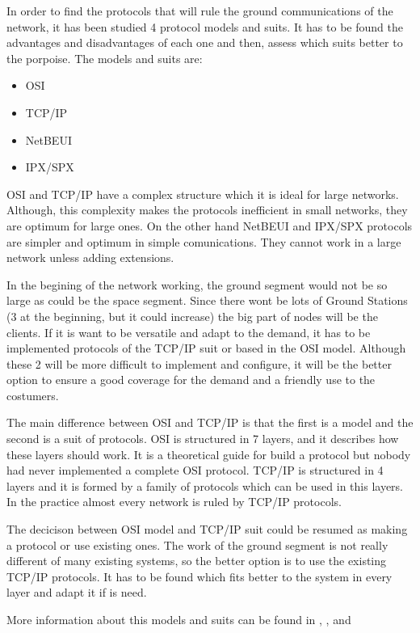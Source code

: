 In order to find the protocols that will rule the ground communications of the network, it has been studied 4 protocol models and suits. It has to be found the advantages and disadvantages of each one and then, assess which suits better to the porpoise. The models and suits are:
\begin{itemize}
\item OSI
\item TCP/IP
\item NetBEUI
\item IPX/SPX
\end{itemize}

OSI and TCP/IP have a complex structure which it is ideal for large networks. Although, this complexity makes the protocols inefficient in small networks, they are optimum for large ones. On the other hand NetBEUI and IPX/SPX protocols are simpler and optimum in simple comunications. They cannot work in a large network unless adding extensions. 

In the begining of the network working, the ground segment would not be so large as could be the space segment. Since there wont be lots of Ground Stations (3 at the beginning, but it could increase) the big part of nodes will be the clients. If it is want to be versatile and adapt to the demand, it has to be implemented protocols of the TCP/IP suit or based in the OSI model. Although these 2 will be more difficult to implement and configure, it will be the better option to ensure a good coverage for the demand and a friendly use to the costumers.

The main difference between OSI and TCP/IP is that the first is a model and the second is a suit of protocols. OSI is structured in 7 layers, and it describes how these layers should work. It is a theoretical guide for build a protocol but nobody had never implemented a complete OSI protocol. TCP/IP is structured in 4 layers and it is formed by a family of protocols which can be used in this layers. In the practice almost every network is ruled by TCP/IP protocols. 

The decicison between OSI model and TCP/IP suit could be resumed as making a protocol or use existing ones. The work of the ground segment is not really different of many existing systems, so the better option is to use the existing TCP/IP protocols. It has to be found which fits better to the system in every layer and adapt it if is need.

More information about this models and suits can be found in \cite{OSI}, \cite{TCPIP}, \cite{NetBEUI} and \cite{IPX}